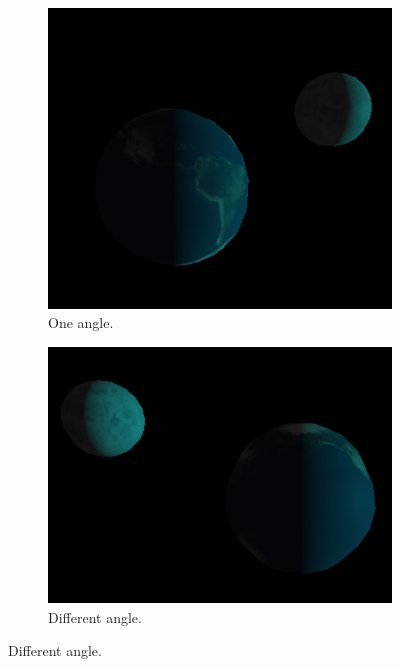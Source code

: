\documentclass[12pt]{article}
\begin{document}
\begin{figure}[!h]
\centering
    \begin{subfigure}{.33\textwidth}
        \centering
        \includegraphics[width = \textwidth]{figs/ex_37_1.png}
        \caption{One angle.}
        \label{fig:ex_37_1}
    \end{subfigure}
    \begin{subfigure}{.33\textwidth}
        \centering
        \includegraphics[width = \textwidth]{figs/ex_37_2.png}
        \caption{Different angle.}
        \label{fig:ex_37_2}
    \end{subfigure}

\end{figure}
\end{document}
